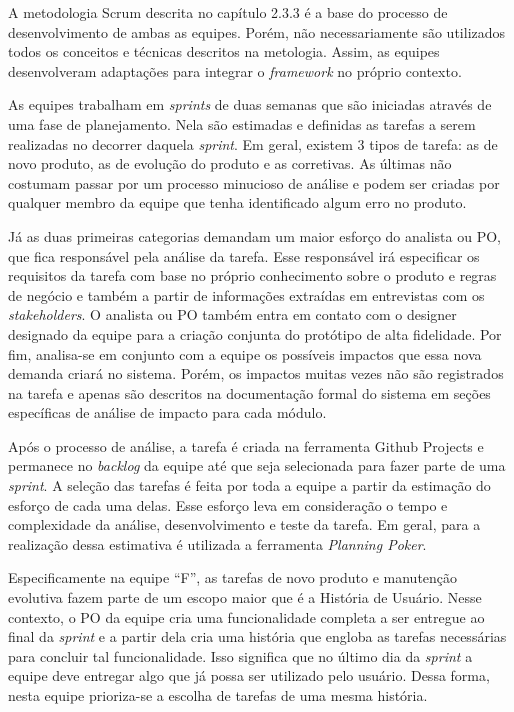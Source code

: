 \documentclass[
    12pt,       %
    openright,      %
    twoside,      %
    a4paper,      %
    english,      %
    french,       %
    spanish,      %
    brazil,       %
    ]{abntex2}
\begin{document}
A metodologia Scrum descrita no capítulo 2.3.3 é a base do processo de desenvolvimento de ambas as equipes. Porém, não necessariamente são utilizados todos os conceitos e técnicas descritos na metologia. Assim, as equipes desenvolveram adaptações para integrar o \textit{framework} no próprio contexto.

As equipes trabalham em \textit{sprints} de duas semanas que são iniciadas através de uma fase de planejamento. Nela são estimadas e definidas as tarefas a serem realizadas no decorrer daquela \textit{sprint}. Em geral, existem 3 tipos de tarefa: as de novo produto, as de evolução do produto e as corretivas. As últimas não costumam passar por um processo minucioso de análise e podem ser criadas por qualquer membro da equipe que tenha identificado algum erro no produto.

Já as duas primeiras categorias demandam um maior esforço do analista ou PO, que fica responsável pela análise da tarefa. Esse responsável irá especificar os requisitos da tarefa com base no próprio conhecimento sobre o produto e regras de negócio e também a partir de informações extraídas em entrevistas com os \textit{stakeholders}. O analista ou PO também entra em contato com o designer designado da equipe para a criação conjunta do protótipo de alta fidelidade. Por fim, analisa-se em conjunto com a equipe os possíveis impactos que essa nova demanda criará no sistema. Porém, os impactos muitas vezes não são registrados na tarefa e apenas são descritos na documentação formal do sistema em seções específicas de análise de impacto para cada módulo.

Após o processo de análise, a tarefa é criada na ferramenta Github Projects e permanece no \textit{backlog} da equipe até que seja selecionada para fazer parte de uma \textit{sprint}. A seleção das tarefas é feita por toda a equipe a partir da estimação do esforço de cada uma delas. Esse esforço leva em consideração o tempo e complexidade da análise, desenvolvimento e teste da tarefa. Em geral, para a realização dessa estimativa é utilizada a ferramenta \textit{Planning Poker}.

Especificamente na equipe ``F'', as tarefas de novo produto e manutenção evolutiva fazem parte de um escopo maior que é a História de Usuário. Nesse contexto, o PO da equipe cria uma funcionalidade completa a ser entregue ao final da \textit{sprint} e a partir dela cria uma história que engloba as tarefas necessárias para concluir tal funcionalidade. Isso significa que no último dia da \textit{sprint} a equipe deve entregar algo que já possa ser utilizado pelo usuário. Dessa forma, nesta equipe prioriza-se a escolha de tarefas de uma mesma história. 
\end{document}
